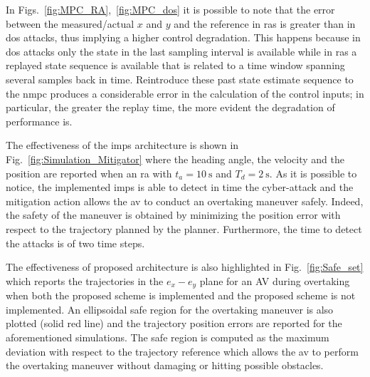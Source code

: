 In Figs.~\ref{fig:MPC_RA},~\ref{fig:MPC_dos} it is possible to note that  the error between the measured/actual $x$ and $y$ and the reference in \glspl{ra} is greater than in \gls{dos} attacks, thus implying a higher control degradation. This happens because in \gls{dos} attacks only the state in the last sampling interval is available while in \glspl{ra} a replayed state sequence is available that is related to a time window spanning several samples back in time. Reintroduce these past state estimate sequence to the \gls{nmpc} produces a considerable error in the calculation of the control inputs; 
in particular, the greater the replay time, the more evident the degradation of performance is.

The effectiveness of the \gls{imps} architecture is shown in \mbox{Fig.~\ref{fig:Simulation_Mitigator}} where the heading angle, the velocity and the position are reported when an \gls{ra} with  $t_a= \SI{10}{\second}$ and $T_d=\SI{2}{\second}$. As it is possible to notice, the implemented \gls{imps} is able to detect in time the cyber-attack and the mitigation action allows the \gls{av} to conduct an overtaking maneuver safely. Indeed, the safety of the maneuver is obtained by minimizing the position error with respect to the trajectory planned by the planner. Furthermore, the time to detect the attacks is of two time steps.

The effectiveness of proposed architecture is also highlighted in Fig.~\ref{fig:Safe_set} which reports the trajectories in the $e_x-e_y$ plane for an AV during overtaking when both the proposed scheme is implemented and the proposed scheme is not implemented. An ellipsoidal safe region for the overtaking maneuver is also plotted (solid red line) and the trajectory position errors are reported for the aforementioned simulations. The safe region is computed as the maximum deviation with respect to the trajectory reference which allows the \gls{av} to perform the overtaking maneuver without damaging or hitting possible obstacles.

